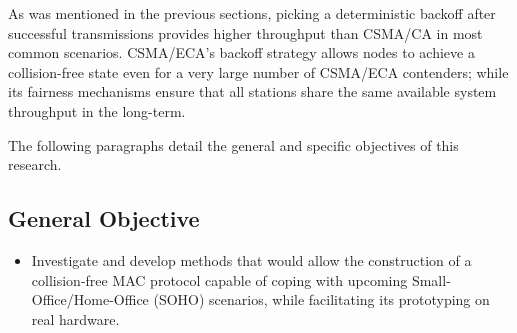 As was mentioned in the previous sections, picking a deterministic backoff after successful transmissions provides higher throughput than CSMA/CA in most common scenarios. CSMA/ECA's backoff strategy allows nodes to achieve a collision-free state even for a very large number of CSMA/ECA contenders; while its fairness mechanisms ensure that all stations share the same available system throughput in the long-term.

The following paragraphs detail the general and specific objectives of this research. 

\subsection{General Objective}
\begin{itemize}
	\item Investigate and develop methods that would allow the construction of a collision-free MAC protocol capable of coping with upcoming Small-Office/Home-Office (SOHO) scenarios, while facilitating its prototyping on real hardware.
	

\end{itemize}

